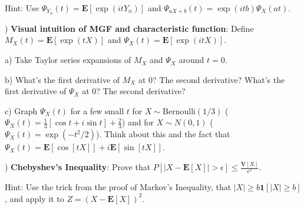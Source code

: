 \documentclass[12pt,english]{article}
\begin{document}
Hint: Use $\Psi_{Y_{n}}(t) = \mathbf{E}[\exp(itY_{n})]$ and $\Psi_{aX + b}(t) = \exp(itb) \Psi_{X}(at)$.

\vspace{1em}
) \textbf{Visual intuition of MGF and characteristic function}: Define $M_{X}(t) = \mathbf{E}[\exp(tX)]$ and $\Psi_{X}(t) = \mathbf{E}[\exp(itX)]$.

\noindent
a) Take Taylor series expansions of $M_{X}$ and $\Psi_{X}$ around $t = 0$.

\noindent
b) What's the first derivative of $M_{X}$ at 0? The second derivative? What's the first derivative of $\Psi_{X}$ at 0? The second derivative?

\noindent
c) Graph $\Psi_{X}(t)$ for a few small $t$ for $X \sim \text{Bernoulli}(1/3)$ ($\Psi_{X}(t) = \frac{1}{3}[\cos t + i \sin t] + \frac{2}{3}$) and for $X \sim N(0, 1)$ ($\Psi_{X}(t) = \exp(-t^{2}/2)$). Think about this and the fact that $\Psi_{X}(t) = \mathbf{E}[\cos[tX]] + i \mathbf{E}[\sin[tX]]$.

\vspace{1em}
) \textbf{Chebyshev's Inequality}: Prove that $P[\left| X - \mathbf{E}[X] \right| > \epsilon] \leq \frac{\mathbf{V}[X]}{\epsilon^{2}}$.

Hint: Use the trick from the proof of Markov's Inequality, that $|X| \geq b \mathbf{1}[|X| \geq b]$, and apply it to $Z = (X - \mathbf{E}[X])^{2}$.
\end{document}
